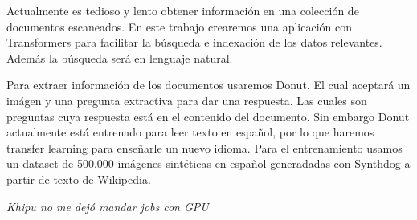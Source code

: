 \documentclass[../main.tex]{subfiles}
\begin{document}



Actualmente es tedioso y lento obtener información en una colección de documentos escaneados.
En este trabajo crearemos una aplicación con Transformers para facilitar la búsqueda e indexación de los datos relevantes.
Además la búsqueda será en lenguaje natural.

Para extraer información de los documentos usaremos Donut.
El cual aceptará un imágen y una pregunta extractiva para dar una respuesta.
Las cuales son preguntas cuya respuesta está en el contenido del documento.
Sin embargo Donut actualmente está entrenado para leer texto en español, por lo que haremos transfer learning para enseñarle un nuevo idioma.
Para el entrenamiento usamos un dataset de 500.000 imágenes sintéticas en español generadadas con Synthdog a partir de texto de Wikipedia.



\emph{Khipu no me dejó mandar jobs con GPU}

%
\end{document}

